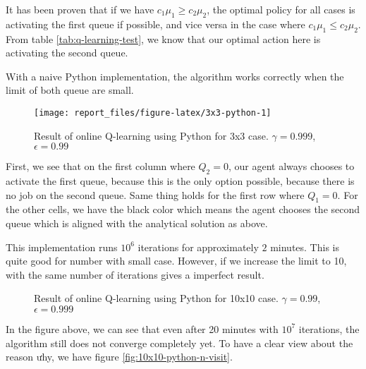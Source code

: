 \documentclass[
  a4paper, xcolor = usenames,dvipsnames]{article}
\theoremstyle{definition}
\theoremstyle{definition}
\theoremstyle{definition}
\theoremstyle{definition}
\theoremstyle{remark}
\begin{document}
It has been proven that if we have \(c_{1} \mu_{1} \ge c_{2} \mu_{2}\), the optimal policy for all cases is activating the first queue if possible, and vice versa in the case where \(c_{1} \mu_{1} \le c_{2} \mu_{2}\). From table \ref{tab:q-learning-test}, we know that our optimal action here is activating the second queue.

With a naive Python implementation, the algorithm works correctly when the limit of both queue are small.

\begin{figure}

{\centering \texttt{[image: report\_files/figure-latex/3x3-python-1]} 

}

\caption{Result of online Q-learning using Python for 3x3 case. $\gamma = 0.999$, $\epsilon = 0.99$}\label{fig:3x3-python}
\end{figure}

First, we see that on the first column where \(Q_{2} = 0\), our agent always chooses to activate the first queue, because this is the only option possible, because there is no job on the second queue. Same thing holds for the first row where \(Q_{1} = 0\). For the other cells, we have the black color which means the agent chooses the second queue which is aligned with the analytical solution as above.

This implementation runs \(10^6\) iterations for approximately \(2\) minutes. This is quite good for number with small case. However, if we increase the limit to 10, with the same number of iterations gives a imperfect result.

\begin{figure}

{\centering {}

}

\caption{Result of online Q-learning using Python for 10x10 case. $\gamma = 0.99$, $\epsilon = 0.999$}\label{fig:10x10-python}
\end{figure}

In the figure above, we can see that even after 20 minutes with \(10^7\) iterations, the algorithm still does not converge completely yet. To have a clear view about the reason ưhy, we have figure \ref{fig:10x10-python-n-visit}.
\end{document}
